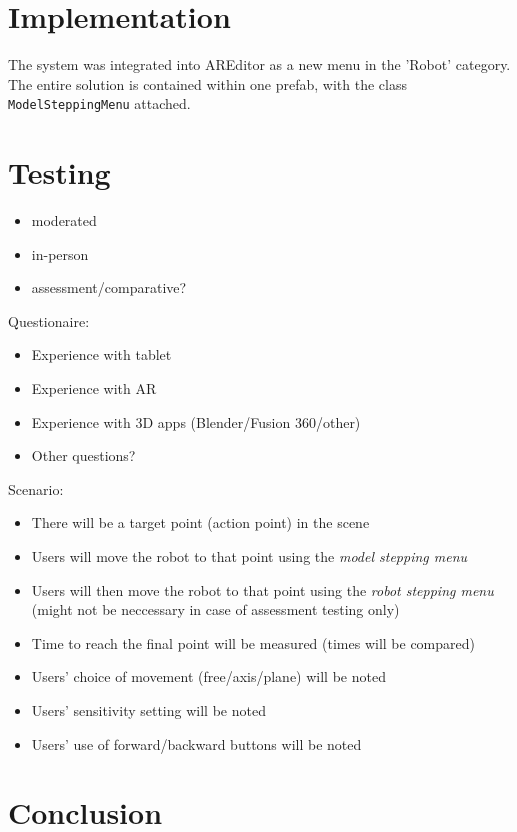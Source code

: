 \chapter{Implementation}

The system was integrated into AREditor as a new menu in the 'Robot' category. The entire solution is contained within one prefab, with the class \texttt{ModelSteppingMenu} attached. 

\chapter{Testing}
\begin{itemize}
    \item moderated
    \item in-person
    \item assessment/comparative?
\end{itemize}

Questionaire:
\begin{itemize}
    \item Experience with tablet
    \item Experience with AR
    \item Experience with 3D apps (Blender/Fusion 360/other)
    \item Other questions?
\end{itemize}

Scenario:
\begin{itemize}
    \item There will be a target point (action point) in the scene
    \item Users will move the robot to that point using the \emph{model stepping menu}
    \item Users will then move the robot to that point using the \emph{robot stepping menu} (might not be neccessary in case of assessment testing only)
    \item Time to reach the final point will be measured (times will be compared)
    \item Users' choice of movement (free/axis/plane) will be noted
    \item Users' sensitivity setting will be noted
    \item Users' use of forward/backward buttons will be noted
\end{itemize}



\chapter{Conclusion}